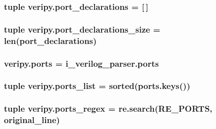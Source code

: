 \hypertarget{namespaceveripy_a99fccb7245b05a502fd01a6cd7ed1c22}{
\subsubsection[{port\-\_\-declarations}]{\setlength{\rightskip}{0pt plus 5cm}tuple veripy.\-port\-\_\-declarations = \mbox{[}$\,$\mbox{]}}}\label{namespaceveripy_a99fccb7245b05a502fd01a6cd7ed1c22}
\hypertarget{namespaceveripy_ad074898a0ed151cd31c981e01863e64b}{
\subsubsection[{port\-\_\-declarations\-\_\-size}]{\setlength{\rightskip}{0pt plus 5cm}tuple veripy.\-port\-\_\-declarations\-\_\-size = len({\bf port\-\_\-declarations})}}\label{namespaceveripy_ad074898a0ed151cd31c981e01863e64b}
\hypertarget{namespaceveripy_ad0eff554700802b50170079f6544c06d}{
\subsubsection[{ports}]{\setlength{\rightskip}{0pt plus 5cm}veripy.\-ports = i\-\_\-verilog\-\_\-parser.\-ports}}\label{namespaceveripy_ad0eff554700802b50170079f6544c06d}
\hypertarget{namespaceveripy_ac40d1f9532d5dad37c9e4457b28b8298}{
\subsubsection[{ports\-\_\-list}]{\setlength{\rightskip}{0pt plus 5cm}tuple veripy.\-ports\-\_\-list = sorted(ports.\-keys())}}\label{namespaceveripy_ac40d1f9532d5dad37c9e4457b28b8298}
\hypertarget{namespaceveripy_a6bbb38d63d1a7dca8d7fe54bfcd9e40e}{
\subsubsection[{ports\-\_\-regex}]{\setlength{\rightskip}{0pt plus 5cm}tuple veripy.\-ports\-\_\-regex = re.\-search(R\-E\-\_\-\-P\-O\-R\-T\-S, {\bf original\-\_\-line})}}\label{namespaceveripy_a6bbb38d63d1a7dca8d7fe54bfcd9e40e}


